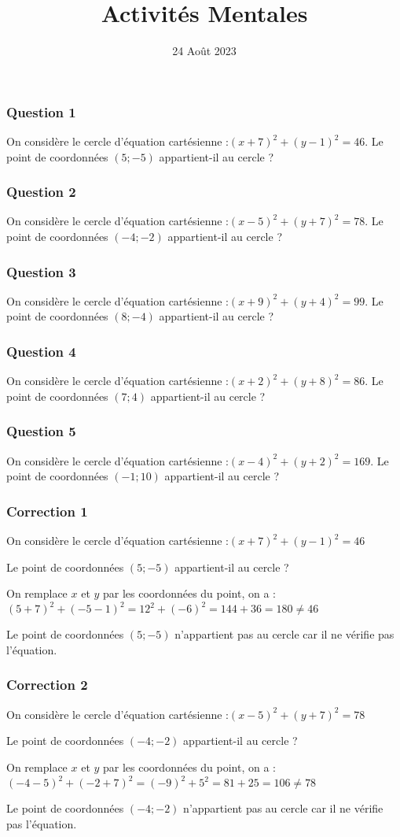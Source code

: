 \documentclass[15pt, mathserif]{beamer}
\title{Activités Mentales}
\date{24 Août 2023}
\begin{document}
\begin{frame}
    \titlepage
\end{frame}

\begin{frame} 
	\frametitle{Question 1}
On considère le cercle d'équation cartésienne :$(x+7)^2+(y-1)^2 =46$. Le point de coordonnées $(5;-5)$ appartient-il au cercle ? \end{frame}


\begin{frame} 
	\frametitle{Question 2}
On considère le cercle d'équation cartésienne :$(x-5)^2+(y+7)^2 =78$. Le point de coordonnées $(-4;-2)$ appartient-il au cercle ? \end{frame}


\begin{frame} 
	\frametitle{Question 3}
On considère le cercle d'équation cartésienne :$(x+9)^2+(y+4)^2 =99$. Le point de coordonnées $(8;-4)$ appartient-il au cercle ? \end{frame}


\begin{frame} 
	\frametitle{Question 4}
On considère le cercle d'équation cartésienne :$(x+2)^2+(y+8)^2 =86$. Le point de coordonnées $(7;4)$ appartient-il au cercle ? \end{frame}


\begin{frame} 
	\frametitle{Question 5}
On considère le cercle d'équation cartésienne :$(x-4)^2+(y+2)^2 =169$. Le point de coordonnées $(-1;10)$ appartient-il au cercle ? \end{frame}


\begin{frame}
\vspace{-10mm}
	\frametitle{Correction 1}
On considère le cercle d'équation cartésienne :$(x+7)^2+(y-1)^2 =46$ 
 
 Le point de coordonnées $(5;-5)$ appartient-il au cercle ? 
 
 \bigskip 
 On remplace $x$ et $y$ par les coordonnées du point, on a : $(5+7)^2+(-5-1)^2 =12^2+\left(-6\right)^2=144+36=180\neq 46$ 
 
 Le point de coordonnées $(5;-5)$ n'appartient pas au cercle car il ne vérifie pas l'équation. \end{frame}


\begin{frame}
\vspace{-10mm}
	\frametitle{Correction 2}
On considère le cercle d'équation cartésienne :$(x-5)^2+(y+7)^2 =78$ 
 
 Le point de coordonnées $(-4;-2)$ appartient-il au cercle ? 
 
 \bigskip 
 On remplace $x$ et $y$ par les coordonnées du point, on a : $(-4-5)^2+(-2+7)^2 =\left(-9\right)^2+5^2=81+25=106\neq 78$ 
 
 Le point de coordonnées $(-4;-2)$ n'appartient pas au cercle car il ne vérifie pas l'équation. \end{frame}
\end{document}
